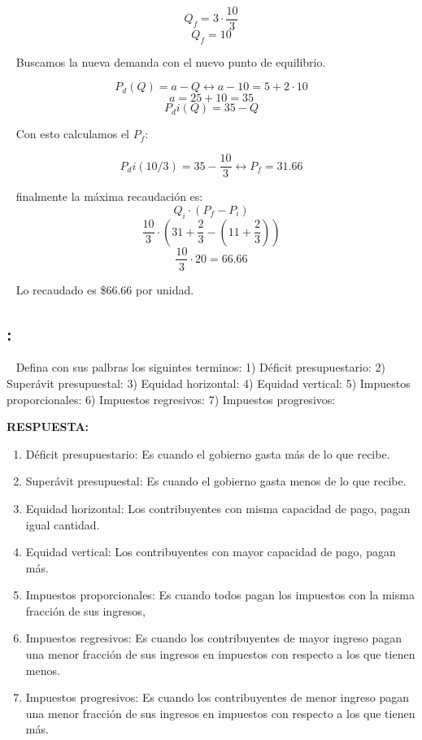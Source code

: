 \documentclass[
  letterpaper,
  DIV=11,
  numbers=noendperiod]{scrreport}
\providecommand{\tightlist}{%
  \setlength{\itemsep}{0pt}\setlength{\parskip}{0pt}}\usepackage{longtable,booktabs,array}
\begin{document}
\[
Q_f=3\cdot\frac{10}{3}
\] \[
Q_f=10
\]

~ Buscamos la nueva demanda con el nuevo punto de equilibrio.

\[
P_d(Q)=a-Q \longleftrightarrow a-10=5+2\cdot10\]
\] \[
a=25+10=35
\] \[
P_di(Q)=35-Q
\]

~ Con esto calculamos el \(P_f\):

\[
P_di(10/3)=35-\frac{10}{3}\leftrightarrow P_f=31.66
\]

~ finalmente la máxima recaudación es: \[
Q_i\cdot (P_f-P_i)
\] \[
\frac{10}{3}\cdot (31+\frac{2}{3}-(11+\frac{2}{3}))
\] \[
\frac{10}{3}\cdot 20=66.66
\]

~ Lo recaudado es \$66.66 por unidad.

\hypertarget{section-36}{%
\subsection{:}\label{section-36}}

~ Defina con sus palbras los siguintes terminos: 1) Déficit
presupuestario: 2) Superávit presupuestal: 3) Equidad horizontal: 4)
Equidad vertical: 5) Impuestos proporcionales: 6) Impuestos regresivos:
7) Impuestos progresivos:

\textbf{RESPUESTA:}

\begin{enumerate}
\def\labelenumi{\arabic{enumi})}
\tightlist
\item
  Déficit presupuestario: Es cuando el gobierno gasta más de lo que
  recibe.
\item
  Superávit presupuestal: Es cuando el gobierno gasta menos de lo que
  recibe.
\item
  Equidad horizontal: Los contribuyentes con misma capacidad de pago,
  pagan igual cantidad.
\item
  Equidad vertical: Los contribuyentes con mayor capacidad de pago,
  pagan más.
\item
  Impuestos proporcionales: Es cuando todos pagan los impuestos con la
  misma fracción de sus ingresos,
\item
  Impuestos regresivos: Es cuando los contribuyentes de mayor ingreso
  pagan una menor fracción de sus ingresos en impuestos con respecto a
  los que tienen menos.
\item
  Impuestos progresivos: Es cuando los contribuyentes de menor ingreso
  pagan una menor fracción de sus ingresos en impuestos con respecto a
  los que tienen más.
\end{enumerate}
\end{document}
